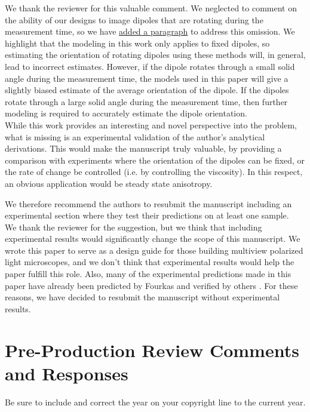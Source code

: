 \documentclass[10pt]{article}
\begin{document}
We thank the reviewer for this valuable comment. We neglected to comment on the
ability of our designs to image dipoles that are rotating during the measurement
time, so we have \hyperlink{temporal}{\color{urlblue} added a paragraph} to
address this omission. We highlight that the modeling in this work only applies
to fixed dipoles, so estimating the orientation of rotating dipoles using these
methods will, in general, lead to incorrect estimates. However, if the dipole
rotates through a small solid angle during the measurement time, the models used
in this paper will give a slightly biased estimate of the average orientation of
the dipole. If the dipoles rotate through a large solid angle during the
measurement time, then further modeling is required to
accurately estimate the dipole orientation.\\

{\color{OE} While this work provides an interesting and novel perspective into
  the problem, what is missing is an experimental validation of the author's
  analytical derivations. This would make the manuscript truly valuable, by
  providing a comparison with experiments where the orientation of the dipoles
  can be fixed, or the rate of change be controlled (i.e. by controlling the
  viscosity). In this respect, an obvious application would be steady state
  anisotropy.}

{\color{OE} We therefore recommend the authors to resubmit the manuscript
  including an experimental section where they test their predictions on at
  least one sample.}\\

We thank the reviewer for the suggestion, but we think that including
experimental results would significantly change the scope of this manuscript. We
wrote this paper to serve as a design guide for those building multiview
polarized light microscopes, and we don't think that experimental results would
help the paper fulfill this role. Also, many of the experimental predictions
made in this paper have already been predicted by Fourkas \cite{fourkas2001} and
verified by others \cite{lu2008}. For these reasons, we have decided to resubmit
the manuscript without experimental results.

\section*{Pre-Production Review Comments and Responses}

{\color{OE} Be sure to include and correct the year on your copyright line to
  the current year.}\\
\end{document}
